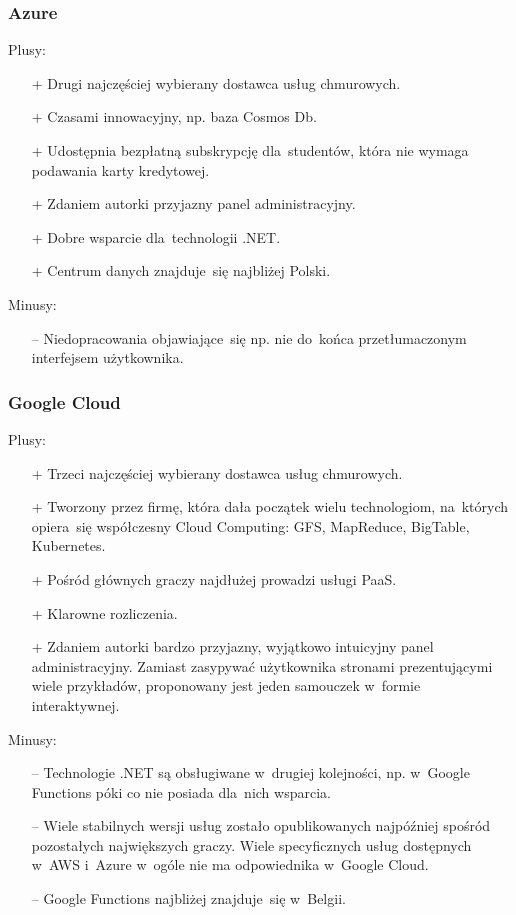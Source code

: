 \documentclass[12pt,a4paper,twoside,titlepage,openright]{book}
\begin{document}
\subsubsection{Azure}

Plusy:
\begin{itemize}
\item[+] Drugi najczęściej wybierany dostawca usług chmurowych.
\item[+] Czasami innowacyjny, np. baza Cosmos Db.
\item[+] Udostępnia bezpłatną subskrypcję dla~studentów, która nie wymaga podawania karty kredytowej.
\item[+] Zdaniem autorki przyjazny panel administracyjny.
\item[+] Dobre wsparcie dla~technologii .NET.
\item[+] Centrum danych znajduje~się najbliżej Polski.
\end{itemize}

\noindent
Minusy:
\begin{itemize}
\item[--] Niedopracowania objawiające~się np. nie do~końca przetłumaczonym interfejsem użytkownika.
\end{itemize}

\subsubsection{Google Cloud}

Plusy:
\begin{itemize}
\item[+] Trzeci najczęściej wybierany dostawca usług chmurowych.
\item[+] Tworzony przez firmę, która dała początek wielu technologiom, na~których opiera~się współczesny Cloud Computing: GFS, MapReduce, BigTable, Kubernetes.
\item[+] Pośród głównych graczy najdłużej prowadzi usługi PaaS.
\item[+] Klarowne rozliczenia.
\item[+] Zdaniem autorki bardzo przyjazny, wyjątkowo intuicyjny panel administracyjny. Zamiast zasypywać użytkownika stronami prezentującymi wiele przykładów, proponowany jest jeden samouczek w~formie interaktywnej.
\end{itemize}

\noindent
Minusy:
\begin{itemize}
\item[--] Technologie .NET są obsługiwane w~drugiej kolejności, np. w~Google Functions póki co nie posiada dla~nich wsparcia.
\item[--] Wiele stabilnych wersji usług zostało opublikowanych najpóźniej spośród pozostałych największych graczy. Wiele specyficznych usług dostępnych w~AWS i~Azure w~ogóle nie ma odpowiednika w~Google Cloud.
\item[--] Google Functions najbliżej znajduje~się w~Belgii.
\end{itemize}
\end{document}
